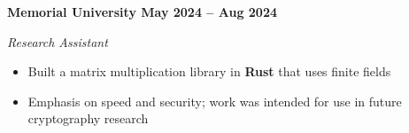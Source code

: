 \textbf{Memorial University \hfill May 2024 -- Aug 2024}\par

\textit{Research Assistant}
\begin{itemize}
	\item Built a matrix multiplication library in \textbf{Rust} that uses finite fields
    \item Emphasis on speed and security; work was intended for use in future cryptography research
\end{itemize}\par

